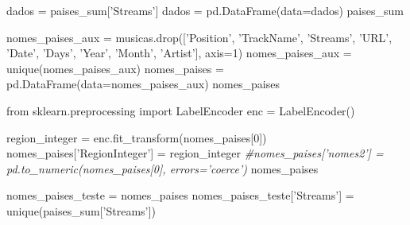 \documentclass[11pt]{article}
\newenvironment{Shaded}{}{}
\newcommand{\DecValTok}[1]{\textcolor[rgb]{0.25,0.63,0.44}{{#1}}}
\newcommand{\StringTok}[1]{\textcolor[rgb]{0.25,0.44,0.63}{{#1}}}
\newcommand{\CommentTok}[1]{\textcolor[rgb]{0.38,0.63,0.69}{\textit{{#1}}}}
\newcommand{\NormalTok}[1]{{#1}}
\newcommand{\ImportTok}[1]{{#1}}
\newcommand{\OperatorTok}[1]{\textcolor[rgb]{0.40,0.40,0.40}{{#1}}}
\begin{document}
\begin{Shaded}
\begin{Highlighting}[]
\NormalTok{    dados }\OperatorTok{=}\NormalTok{ paises_sum[}\StringTok{'Streams'}\NormalTok{]}
\NormalTok{    dados }\OperatorTok{=}\NormalTok{ pd.DataFrame(data}\OperatorTok{=}\NormalTok{dados)}
\NormalTok{    paises_sum}
\end{Highlighting}
\end{Shaded}

    \begin{Shaded}
\begin{Highlighting}[]
\NormalTok{    nomes_paises_aux }\OperatorTok{=}\NormalTok{ musicas.drop([}\StringTok{'Position'}\NormalTok{, }\StringTok{'TrackName'}\NormalTok{, }\StringTok{'Streams'}\NormalTok{, }\StringTok{'URL'}\NormalTok{, }\StringTok{'Date'}\NormalTok{, }\StringTok{'Days'}\NormalTok{, }\StringTok{'Year'}\NormalTok{, }\StringTok{'Month'}\NormalTok{, }\StringTok{'Artist'}\NormalTok{], axis}\OperatorTok{=}\DecValTok{1}\NormalTok{)}
\NormalTok{    nomes_paises_aux }\OperatorTok{=}\NormalTok{ unique(nomes_paises_aux)}
\NormalTok{    nomes_paises }\OperatorTok{=}\NormalTok{ pd.DataFrame(data}\OperatorTok{=}\NormalTok{nomes_paises_aux)}
\NormalTok{    nomes_paises}
\end{Highlighting}
\end{Shaded}

    \begin{Shaded}
\begin{Highlighting}[]
    \ImportTok{from}\NormalTok{ sklearn.preprocessing }\ImportTok{import}\NormalTok{ LabelEncoder}
\NormalTok{    enc }\OperatorTok{=}\NormalTok{ LabelEncoder()}

\NormalTok{    region_integer }\OperatorTok{=}\NormalTok{ enc.fit_transform(nomes_paises[}\DecValTok{0}\NormalTok{])}
\NormalTok{    nomes_paises[}\StringTok{'RegionInteger'}\NormalTok{] }\OperatorTok{=}\NormalTok{ region_integer}
    \CommentTok{#nomes_paises['nomes2'] = pd.to_numeric(nomes_paises[0], errors='coerce')}
\NormalTok{    nomes_paises}
\end{Highlighting}
\end{Shaded}

    \begin{Shaded}
\begin{Highlighting}[]
\NormalTok{    nomes_paises_teste }\OperatorTok{=}\NormalTok{ nomes_paises}
\NormalTok{    nomes_paises_teste[}\StringTok{'Streams'}\NormalTok{] }\OperatorTok{=}\NormalTok{ unique(paises_sum[}\StringTok{'Streams'}\NormalTok{])}
\end{Highlighting}
\end{Shaded}
\end{document}
